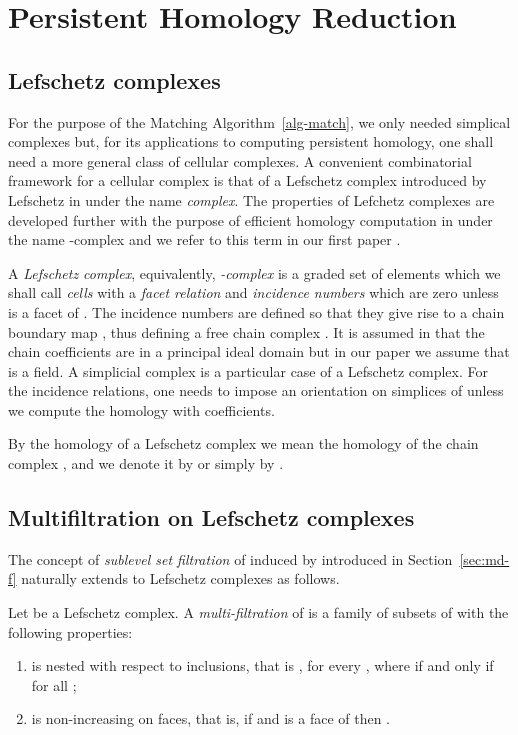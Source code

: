\documentclass[12pt]{article}
\newenvironment{aenum}{\begin{enumerate}
 \renewcommand{\theenumi}{\alph{enumi}}
 \renewcommand{\labelenumi}{(\theenumi)}}{\end{enumerate}}
\begin{document}
\section{Persistent Homology Reduction}
\label{per-hom}

\subsection{Lefschetz complexes}

For the purpose of the Matching Algorithm~\ref{alg-match}, we only needed simplical complexes but, for its applications to computing persistent homology, one shall need a more general class of cellular complexes. A convenient combinatorial framework for a cellular complex is that of a Lefschetz complex introduced by Lefschetz in \cite{Lef42} under the name {\em complex}. The properties of Lefchetz complexes are developed further with the purpose of efficient homology computation in \cite{MrBa09} under the name -complex and we refer to this term in our first paper \cite{AlKaLa17}.

A {\em  Lefschetz complex}, equivalently, {\em -complex} is a graded set  of elements which we shall call {\em cells} with a {\em facet relation}  and {\em incidence numbers}  which are zero unless  is a facet of . The incidence numbers are defined so that they give rise to a chain boundary map , thus defining a free chain complex . It is assumed in \cite{MrBa09} that the chain coefficients are in a principal ideal domain  but in our paper we assume that  is a field. A simplicial complex  is a particular case of a Lefschetz complex. For the incidence relations, one needs to impose an orientation on simplices of  unless we compute the homology with  coefficients.

By the homology of a Lefschetz complex  we mean the homology of the chain complex , and we denote it by  or simply by .

\subsection{Multifiltration on Lefschetz complexes}\label{sec:S-m-filt}

The concept of {\em sublevel set filtration} of  induced by  introduced in Section~\ref{sec:md-f} naturally extends to Lefschetz complexes as follows.

Let  be a Lefschetz complex. A {\em multi-filtration} of  is a family  of
subsets of  with the following properties:
\begin{aenum}
\item  is nested with respect to inclusions, that is , for every ,
where  if and only if  for all ;
\item  is non-increasing on faces, that is, if  and  is a face of  then .
\end{aenum}
\end{document}

